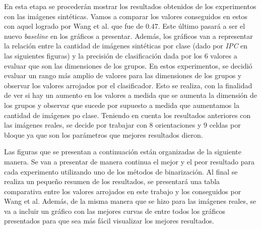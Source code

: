     En esta etapa se procederán mostrar los resultados obtenidos de los experimentos con las imágenes sintéticas. Vamos a comparar los valores conseguidos en estos con aquel logrado por Wang et al. que fue de $0.47$. Este último pasará a ser el nuevo \textit{baseline} en los gráficos a presentar. Además, los gráficos van a representar la relación entre la cantidad de imágenes sintéticas por clase (dado por \textit{IPC} en las siguientes figuras) y la precisión de clasificación dada por los $6$ valores a evaluar que son las dimensiones de los grupos. En estos experimentos, se decidió evaluar un rango más amplio de valores para las dimensiones de los grupos y observar los valores arrojados por el clasificador. Esto se realiza, con la finalidad de ver si hay un aumento en los valores a medida que se aumenta la dimensión de los grupos y observar que sucede por supuesto a medida que aumentamos la cantidad de imágenes po clase. Teniendo en cuenta los resultados anteriores con las imágenes reales, se decide por trabajar con $8$ orientaciones y $9$ celdas por bloque ya que son los parámetros que mejores resultados dieron. 
    
    Las figuras que se presentan a continuación están organizadas de la siguiente manera. Se van a presentar de manera continua el mejor y el peor resultado para cada experimento utilizando uno de los métodos de binarización. Al final se realiza un pequeño resumen de los resultados, se presentará una tabla comparativa entre los valores arrojados en este trabajo y los conseguidos por Wang et al. Además, de la misma manera que se hizo para las imágenes reales, se va a incluir un gráfico con las mejores curvas de entre todos los gráficos presentados para que sea más fácil visualizar los mejores resultados.


